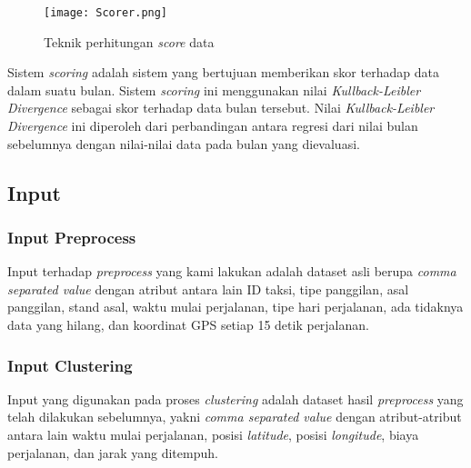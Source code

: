 \documentclass{article}
\begin{document}
\begin{adjustwidth}{2em}{0pt}
	
	\begin{figure}[H]
		\centering
		\texttt{[image: Scorer.png]}
		\caption{Teknik perhitungan \textit{score} data}
	\end{figure}
	
	\hspace{\parindent}Sistem \textit{scoring} adalah sistem yang bertujuan memberikan skor terhadap data dalam suatu bulan. Sistem \textit{scoring} ini menggunakan nilai \textit{Kullback-Leibler Divergence} sebagai skor terhadap data bulan tersebut. Nilai \textit{Kullback-Leibler Divergence} ini diperoleh dari perbandingan antara regresi dari nilai bulan sebelumnya dengan nilai-nilai data pada bulan yang dievaluasi.
	
\end{adjustwidth}

\subsection{Input}

\subsubsection{Input Preprocess}

\begin{adjustwidth}{4em}{0pt}
	
	\hspace{\parindent}Input terhadap \textit{preprocess} yang kami lakukan adalah dataset asli berupa \textit{comma separated value} dengan atribut antara lain ID taksi, tipe panggilan, asal panggilan, stand asal, waktu mulai perjalanan, tipe hari perjalanan, ada tidaknya data yang hilang, dan koordinat GPS setiap 15 detik perjalanan.
	
\end{adjustwidth}

\subsubsection{Input Clustering}

\begin{adjustwidth}{4em}{0pt}
	
	\hspace{\parindent}Input yang digunakan pada proses \textit{clustering} adalah dataset hasil \textit{preprocess} yang telah dilakukan sebelumnya, yakni \textit{comma separated value} dengan atribut-atribut antara lain waktu mulai perjalanan, posisi \textit{latitude}, posisi \textit{longitude}, biaya perjalanan, dan jarak yang ditempuh.
	
	
\end{adjustwidth}
\end{document}
